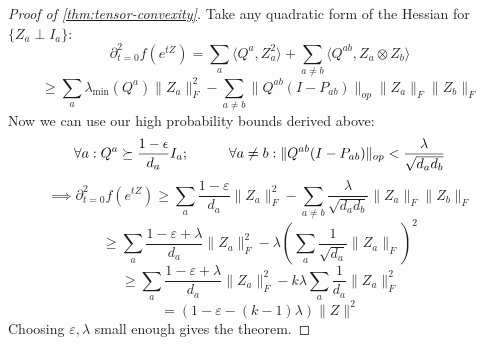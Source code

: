 \documentclass{article}
\newcommand\eps{\varepsilon}
\newcommand\tr{\operatorname{Tr}}
\begin{document}
\begin{proof} [Proof of \cref{thm:tensor-convexity}]
Take any quadratic form of the Hessian for $\{Z_{a} \perp I_{a}\}$:
\[ \partial_{t=0}^{2} f(e^{t Z}) = \sum_{a} \langle Q^{a}, Z_{a}^{2} \rangle + \sum_{a \neq b} \langle Q^{ab}, Z_{a} \otimes Z_{b} \rangle   \]
\[ \geq \sum_{a} \lambda_{\min}(Q^{a}) \|Z_{a}\|_{F}^{2} - \sum_{a \neq b} \|Q^{ab} (I-P_{ab})\|_{op} \|Z_{a}\|_{F} \|Z_{b}\|_{F}    \]
Now we can use our high probability bounds derived above:
\[ \forall a: Q^{a} \succeq \frac{1-\epsilon}{d_{a}} I_{a}; \hspace{10mm}
\forall a \neq b: \|Q^{ab} (I-P_{ab})\|_{op} < \frac{\lambda}{\sqrt{d_{a} d_{b}}}   \]
\[ \implies \partial_{t=0}^{2} f(e^{t Z}) \geq \sum_{a} \frac{1-\eps}{d_{a}} \|Z_{a}\|_{F}^{2} - \sum_{a \neq b} \frac{\lambda}{\sqrt{d_{a} d_{b}}} \|Z_{a}\|_{F} \|Z_{b}\|_{F}  \]
\[ \geq \sum_{a} \frac{1-\eps+\lambda}{d_{a}} \|Z_{a}\|_{F}^{2} - \lambda \left( \sum_{a} \frac{1}{\sqrt{d_{a}}} \|Z_{a}\|_{F}   \right)^{2}   \]
\[ \geq \sum_{a} \frac{1-\eps+\lambda}{d_{a}} \|Z_{a}\|_{F}^{2} - k\lambda \sum_{a} \frac{1}{d_{a}} \|Z_{a}\|_{F}^{2} \]
\[ = (1-\eps-(k-1)\lambda) \|Z\|^{2}    \]
Choosing $\eps,\lambda$ small enough gives the theorem.
\end{proof}









\end{document}
